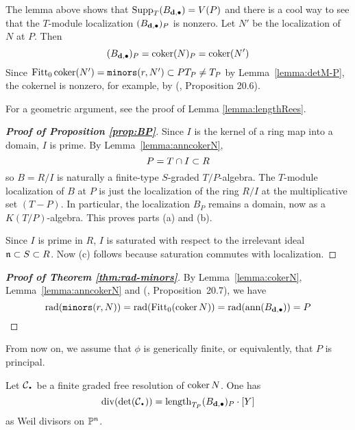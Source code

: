 \documentclass[fleqn,reqno]{amsart}
\begin{document}
\begin{remarkhint}
The lemma above shows that $\operatorname{Supp}_T (B_{\mathbf d,\bullet})=V(P)$ and there is a cool way
to see that the $T$-module localization $(B_{\mathbf d,\bullet})_P$ is nonzero.
Let $N'$ be the localization of $N$ at $P$.
Then 
\[
	(B_{\mathbf d,\bullet})_P=\operatorname{coker}(N)_P=\operatorname{coker}(N')
\]
Since $\operatorname{Fitt}_0\operatorname{coker}(N')=\mathop{\tt minors}(r,N')\subset PT_P\neq T_P$ by Lemma~\ref{lemma:detM-P},
the cokernel is nonzero, for example, by (\citet{Eis95}, Proposition 20.6).

For a geometric argument, see the proof of Lemma \ref{lemma:lengthRees}.
\end{remarkhint}

\begin{proof}[\bf Proof of Proposition \ref{prop:BP}]
Since $I$ is the kernel of a ring map into a domain, $I$ is prime.
By Lemma~\ref{lemma:anncokerN},
\[
	P=T\cap I\subset R
\]
so $B=R/I$ is naturally a finite-type $S$-graded $T/P$-algebra.
The $T$-module localization of $B$ at $P$ is just
the localization of the ring $R/I$ at the multiplicative set $(T-P)$.
In particular, the localization $B_P$ remains a domain,
now as a $K(T/P)$-algebra.
This proves parts (a) and (b).

Since $I$ is prime in $R$, $I$ is saturated with respect to the irrelevant ideal $\mathfrak{n}\subset S\subset R$.
Now (c) follows because saturation commutes with localization.
\end{proof}

\begin{proof}[\bf Proof of Theorem \ref{thm:rad-minors}]
By Lemma~\ref{lemma:cokerN}, Lemma~\ref{lemma:anncokerN} and
(\citet{Eis95}, Proposition~20.7),
we have
\[
	\operatorname{rad}(\mathop{\tt minors}(r,N))=\operatorname{rad}(\operatorname{Fitt}_0(\operatorname{coker} N))=\operatorname{rad}(\operatorname{ann} (B_{\mathbf d,\bullet}))=P\qedhere
\]
\end{proof}

\begin{paragraf*}
From now on, we assume that $\phi$ is generically finite, or equivalently,
that $P$ is principal.
\end{paragraf*}

\begin{lemma}
\label{lemma:divdetC}
Let $\mathcal{C}_\nbul$ be a finite graded free resolution of $\operatorname{coker} N$. One has
\[
	\thediv(\det(\mathcal{C}_\nbul))=\length_{T_P}(B_{\d,\bullet})_P\cdot[Y]
\]
as Weil divisors on $\mathbb{P}^n$.
\end{lemma}
\end{document}
